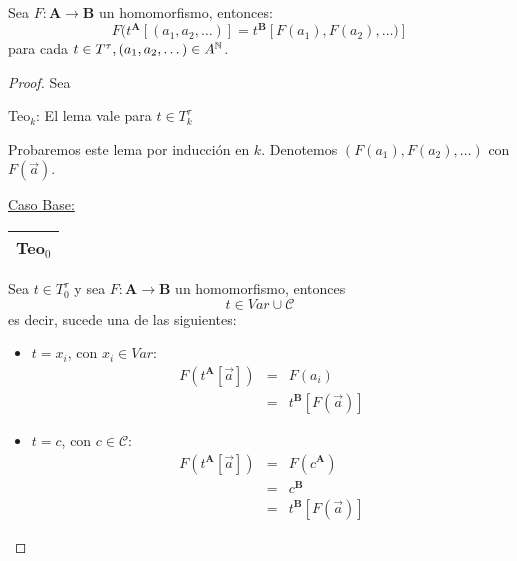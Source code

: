   \begin{lemma} \label{lemma_48}
    \PN Sea $F: \mathbf{A} \rightarrow \mathbf{B}$ un homomorfismo, entonces:
    \[
      F(t^{\mathbf{A}}[(a_{1}, a_{2}, \dotsc)] = t^{\mathbf{B}}[F(a_{1}), F(a_{2}), \dotsc)]
    \]
    \PN para cada $t \in T^{\tau}, (a_{1}, a_{2}, \dotsc) \in A^{\mathbb{N}}$.
  \end{lemma}
  \begin{proof}
    \PN Sea
    \begin{center}
      Teo$_{k}$: El lema vale para $t \in T_{k}^{\tau}$
    \end{center}
    \PN Probaremos este lema por inducción en $k$. Denotemos $(F(a_{1}), F(a_{2}), \dotsc)$ con $F(\vec{a})$.

    \vspace{3mm}
    \PN \underline{Caso Base:} \begin{tabular}{|c|} \hline Teo$_{0}$ \\\hline \end{tabular} Sea $t \in T_{0}^{\tau}$ y
    sea $F: \mathbf{A} \rightarrow \mathbf{B}$ un homomorfismo, entonces
    \[
      t \in Var \cup \mathcal{C}
    \]
    \PN es decir, sucede una de las siguientes:
    \begin{itemize}
      \item $t = x_{i}$, con $x_{i} \in Var$:
      \begin{eqnarray*}
        F(t^{\mathbf{A}}[\vec{a}]) &=& F(a_{i}) \\
        &=& t^{\mathbf{B}}[F(\vec{a})]
      \end{eqnarray*}
      \item $t = c$, con $c \in \mathcal{C}$:
      \begin{eqnarray*}
        F(t^{\mathbf{A}}[\vec{a}]) &=& F(c^{\mathbf{A}}) \\
        &=& c^{\mathbf{B}} \\
        &=& t^{\mathbf{B}}[F(\vec{a})]
      \end{eqnarray*}
    \end{itemize}


\end{proof}
